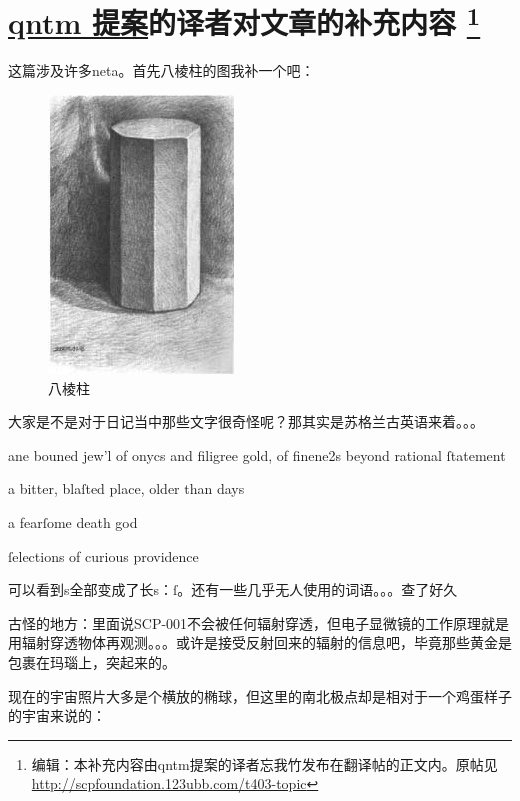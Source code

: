 \chapter[qntm 提案的译者对文章的补充内容]{
	\hyperref[chap:SCP.001.the.lock]{qntm 提案}的译者对文章的补充内容
	\protect\footnote{
		编辑\QIS ：本补充内容由qntm提案的译者忘我竹发布在翻译帖的正文内。原帖见 \url{http://scpfoundation.123ubb.com/t403-topic}
	}
}

\label{chap:qntm.translator.append}

这篇涉及许多neta。首先八棱柱的图我补一个吧：

\begin{figure}[H]
	\centering
	\includegraphics{images/appendix.2.1.jpg}
	\caption*{八棱柱}
\end{figure}

大家是不是对于日记当中那些文字很奇怪呢？那其实是苏格兰古英语来着。。。

ane bouned jew'l of onycs and filigree gold, of finene2s beyond rational ſtatement

a bitter, blaſted place, older than days

a fearſome death god

ſelections of curious providence

可以看到s全部变成了长s：ſ。还有一些几乎无人使用的词语。。。查了好久

古怪的地方：里面说SCP-001不会被任何辐射穿透，但电子显微镜的工作原理就是用辐射穿透物体再观测。。。或许是接受反射回来的辐射的信息吧，毕竟那些黄金是包裹在玛瑙上，突起来的。

现在的宇宙照片大多是个横放的椭球，但这里的南北极点却是相对于一个鸡蛋样子的宇宙来说的：

